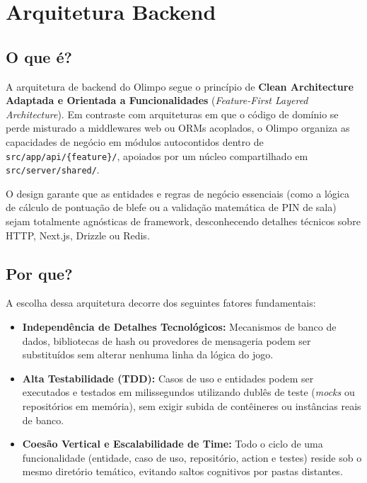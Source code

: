 \documentclass[12pt,a4paper]{article}
\begin{document}
\section{Arquitetura Backend}

\subsection{O que é?}
A arquitetura de backend do Olimpo segue o princípio de \textbf{Clean Architecture Adaptada e Orientada a Funcionalidades} (\textit{Feature-First Layered Architecture}). Em contraste com arquiteturas em que o código de domínio se perde misturado a middlewares web ou ORMs acoplados, o Olimpo organiza as capacidades de negócio em módulos autocontidos dentro de \texttt{src/app/api/\{feature\}/}, apoiados por um núcleo compartilhado em \texttt{src/server/shared/}.

O design garante que as entidades e regras de negócio essenciais (como a lógica de cálculo de pontuação de blefe ou a validação matemática de PIN de sala) sejam totalmente agnósticas de framework, desconhecendo detalhes técnicos sobre HTTP, Next.js, Drizzle ou Redis.

\subsection{Por que?}
A escolha dessa arquitetura decorre dos seguintes fatores fundamentais:
\begin{itemize}
  \item \textbf{Independência de Detalhes Tecnológicos:} Mecanismos de banco de dados, bibliotecas de hash ou provedores de mensageria podem ser substituídos sem alterar nenhuma linha da lógica do jogo.
  \item \textbf{Alta Testabilidade (TDD):} Casos de uso e entidades podem ser executados e testados em milissegundos utilizando dublês de teste (\textit{mocks} ou repositórios em memória), sem exigir subida de contêineres ou instâncias reais de banco.
  \item \textbf{Coesão Vertical e Escalabilidade de Time:} Todo o ciclo de uma funcionalidade (entidade, caso de uso, repositório, action e testes) reside sob o mesmo diretório temático, evitando saltos cognitivos por pastas distantes.
\end{itemize}
\end{document}
